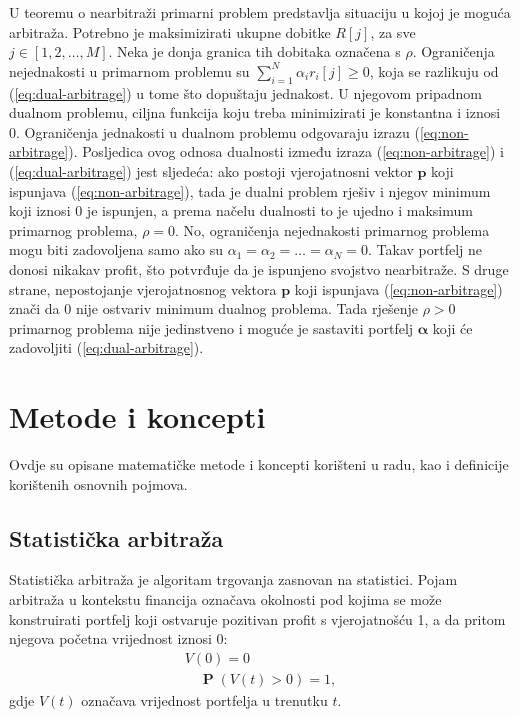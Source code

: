 \documentclass[lmodern, utf8, diplomski, numeric]{fer}
\newcommand{\matr}[1]{\mathbold{#1}}
\newcommand{\prob}[1]{\operatorname{\mathbf{P}}\q(#1\w)}
\newcommand{\q}{\left}
\newcommand{\w}{\right}
\begin{document}
  U teoremu o nearbitraži primarni problem predstavlja situaciju u kojoj je moguća arbitraža.
  Potrebno je maksimizirati ukupne dobitke $R\q[j\w]$, za sve $j \in \q[1, 2, \ldots, M\w]$.
  Neka je donja granica tih dobitaka označena s $\rho$.
  Ograničenja nejednakosti u primarnom problemu su $\sum_{i = 1}^{N} \alpha_i r_i\q[j\w] \ge 0$, koja se razlikuju od (\ref{eq:dual-arbitrage}) u tome što dopuštaju jednakost.
  U njegovom pripadnom dualnom problemu, ciljna funkcija koju treba minimizirati je konstantna i iznosi 0.
  Ograničenja jednakosti u dualnom problemu odgovaraju izrazu (\ref{eq:non-arbitrage}).
  Posljedica ovog odnosa dualnosti između izraza (\ref{eq:non-arbitrage}) i (\ref{eq:dual-arbitrage}) jest sljedeća: ako postoji vjerojatnosni vektor $\matr{p}$ koji ispunjava (\ref{eq:non-arbitrage}), tada je dualni problem rješiv i njegov minimum koji iznosi 0 je ispunjen, a prema načelu dualnosti to je ujedno i maksimum primarnog problema, $\rho = 0$.
  No, ograničenja nejednakosti primarnog problema mogu biti zadovoljena samo ako su $\alpha_1 = \alpha_2 = \ldots = \alpha_N = 0$.
  Takav portfelj ne donosi nikakav profit, što potvrđuje da je ispunjeno svojstvo nearbitraže.
  S druge strane, nepostojanje vjerojatnosnog vektora $\matr p$ koji ispunjava (\ref{eq:non-arbitrage}) znači da 0 nije ostvariv minimum dualnog problema.
  Tada rješenje $\rho > 0$ primarnog problema nije jedinstveno i moguće je sastaviti portfelj $\matr \alpha$ koji će zadovoljiti (\ref{eq:dual-arbitrage}).

  \chapter{Metode i koncepti}
  Ovdje su opisane matematičke metode i koncepti korišteni u radu, kao i definicije korištenih osnovnih pojmova.
  
  \section{Statistička arbitraža}
  Statistička arbitraža  je algoritam trgovanja zasnovan na statistici.
  Pojam arbitraža u kontekstu financija označava okolnosti pod kojima se može konstruirati portfelj koji ostvaruje pozitivan profit s vjerojatnošću 1, a da pritom njegova početna vrijednost iznosi 0:
  \begin{equation}
  \begin{gathered}
  \label{eq:statarb}
  V\q(0\w) = 0\\
  \quad \prob{V\q(t\w) > 0} = 1,
  \end{gathered}
  \end{equation}
  gdje $V\q(t\w)$ označava vrijednost portfelja u trenutku $t$.
  
\end{document}
